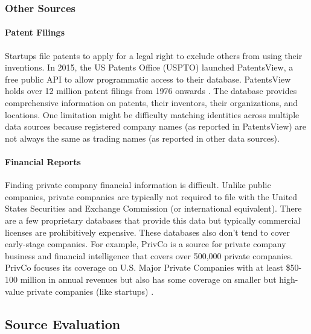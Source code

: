 \documentclass[../thesis/thesis.tex]{subfiles}
\begin{document}
\subsubsection{Other Sources}

\paragraph{Patent Filings}

Startups file patents to apply for a legal right to exclude others from using their inventions. In 2015, the US Patents Office (USPTO) launched PatentsView, a free public API to allow programmatic access to their database. PatentsView holds over 12 million patent filings from 1976 onwards \cite{CITE}. The database provides comprehensive information on patents, their inventors, their organizations, and locations. One limitation might be difficulty matching identities across multiple data sources because registered company names (as reported in PatentsView) are not always the same as trading names (as reported in other data sources).

\paragraph{Financial Reports}

Finding private company financial information is difficult. Unlike public companies, private companies are typically not required to file with the United States Securities and Exchange Commission (or international equivalent). There are a few proprietary databases that provide this data but typically commercial licenses are prohibitively expensive. These databases also don't tend to cover early-stage companies. For example, PrivCo is a source for private company business and financial intelligence that covers over 500,000 private companies. PrivCo focuses its coverage on U.S. Major Private Companies with at least \$50-100 million in annual revenues but also has some coverage on smaller but high-value private companies (like startups) \cite{CITE}.

\subsection{Source Evaluation}
\end{document}
